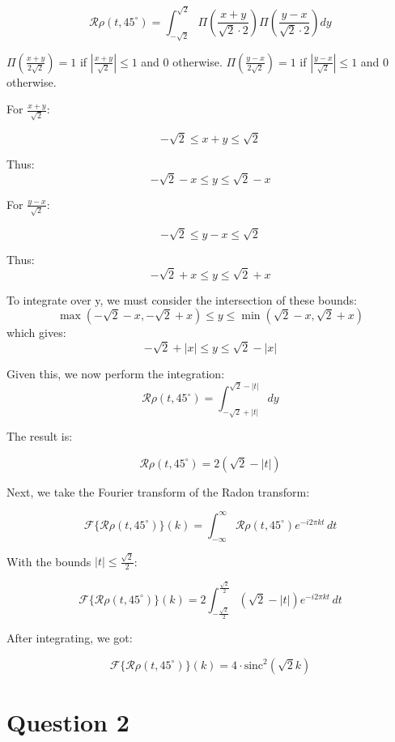 \documentclass[12pt,twoside]{article}
\begin{document}
\begin{enumerate}
\[
\mathcal{R}\rho(t, 45^\circ) = \int_{-\sqrt{2}}^{\sqrt{2}} \Pi \left(\frac{x+y}{\sqrt{2} \cdot 2}\right) \Pi \left(\frac{y-x}{\sqrt{2} \cdot 2}\right) dy
\]

$\Pi \left(\frac{x+y}{2 \sqrt{2}} \right) = 1$  if \(\left|\frac{x+y}{\sqrt{2}}\right| \leq 1 \) and 0 otherwise.
$\Pi \left(\frac{y-x}{2 \sqrt{2}} \right) = 1$  if \(\left|\frac{y-x}{\sqrt{2}}\right| \leq 1 \) and 0 otherwise.


For  $\frac{x+y}{\sqrt{2}}$:

\[
-\sqrt{2} \leq x + y \leq \sqrt{2}
\]

Thus:
\[
-\sqrt{2} - x \leq y \leq \sqrt{2} - x
\]

For  $\frac{y-x}{\sqrt{2}}$:

\[
-\sqrt{2} \leq y - x \leq \sqrt{2}
\]

Thus:
\[
-\sqrt{2} + x \leq y \leq \sqrt{2} + x
\]

To integrate over y,  we must consider the intersection of these bounds:
\[
\max\left(-\sqrt{2} - x, -\sqrt{2} + x\right) \leq y \leq \min\left(\sqrt{2} - x, \sqrt{2} + x\right)
\]
which gives:
\[
-\sqrt{2} + |x| \leq y \leq \sqrt{2} - |x|
\]

Given this, we now perform the integration:
\[
\mathcal{R}\rho(t, 45^\circ) = \int_{-\sqrt{2} + |t|}^{\sqrt{2} - |t|} dy
\]

The result is:

\[
\mathcal{R}\rho(t, 45^\circ) =2 ( \sqrt{2} - |t| )
\]

Next, we take the Fourier transform of the Radon transform:

\[
\mathcal{F}\{ \mathcal{R}\rho(t, 45^\circ) \}(k) = \int_{-\infty}^{\infty} \mathcal{R}\rho(t, 45^\circ) e^{-i2\pi kt} \, dt
\]

With the bounds \( |t| \leq \frac{\sqrt{2}}{2} \):

\[
\mathcal{F}\{ \mathcal{R}\rho(t, 45^\circ) \}(k) = 2 \int_{-\frac{\sqrt{2}}{2}}^{\frac{\sqrt{2}}{2}} \left(\sqrt{2} - |t|\right) e^{-i2\pi kt} \, dt
\]

After integrating, we got:

\[
\mathcal{F}\{ \mathcal{R}\rho(t, 45^\circ) \}(k) = 4 \cdot  \text{sinc}^2\left(\sqrt{2} k\right)
\]

     \end{enumerate}
            
\section*{Question 2}
\end{document}
